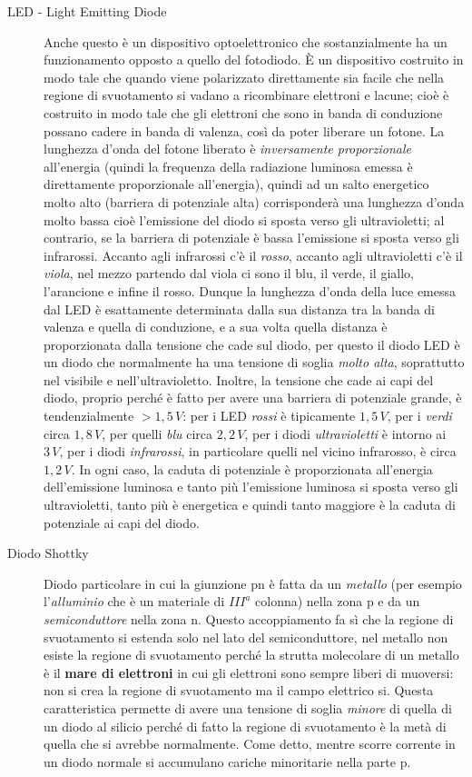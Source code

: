 \documentclass[12pt, a4paper]{report}
\begin{document}
\begin{description}
    \item[LED - Light Emitting Diode] Anche questo è un dispositivo optoelettronico che sostanzialmente ha un funzionamento opposto a quello del fotodiodo. È un dispositivo costruito in modo tale che quando viene polarizzato direttamente sia facile che nella regione di svuotamento si vadano a ricombinare elettroni e lacune; cioè è costruito in modo tale che gli elettroni che sono in banda di conduzione possano cadere in banda di valenza, così da poter liberare un fotone. La lunghezza d'onda del fotone liberato è \textit{inversamente proporzionale} all'energia (quindi la frequenza della radiazione luminosa emessa è direttamente proporzionale all'energia), quindi ad un salto energetico molto alto (barriera di potenziale alta) corrisponderà una lunghezza d'onda molto bassa cioè l'emissione del diodo si sposta verso gli ultravioletti; al contrario, se la barriera di potenziale è bassa l'emissione si sposta verso gli infrarossi. Accanto agli infrarossi c'è il \textit{rosso}, accanto agli ultravioletti c'è il \textit{viola}, nel mezzo partendo dal viola ci sono il blu, il verde, il giallo, l'arancione e infine il rosso. Dunque la lunghezza d'onda della luce emessa dal LED è esattamente determinata dalla sua distanza tra la banda di valenza e quella di conduzione, e a sua volta quella distanza è proporzionata dalla tensione che cade sul diodo, per questo il diodo LED è un diodo che normalmente ha una tensione di soglia \textit{molto alta}, soprattutto nel visibile e nell'ultravioletto. Inoltre, la tensione che cade ai capi del diodo, proprio perché è fatto per avere una barriera di potenziale grande, è tendenzialmente $> 1,5\,V$: per i LED \textit{rossi} è tipicamente $1,5\,V$, per i \textit{verdi} circa $1,8\,V$, per quelli \textit{blu} circa $2,2\,V$, per i diodi \textit{ultravioletti} è intorno ai $3\,V$, per i diodi \textit{infrarossi}, in particolare quelli nel vicino infrarosso, è circa $1,2\,V$. In ogni caso, la caduta di potenziale è proporzionata all'energia dell'emissione luminosa e tanto più l'emissione luminosa si sposta verso gli ultravioletti, tanto più è energetica e quindi tanto maggiore è la caduta di potenziale ai capi del diodo.
    \item[Diodo Shottky] Diodo particolare in cui la giunzione pn è fatta da un \textit{metallo} (per esempio l'\textit{alluminio} che è un materiale di $III^{a}$ colonna) nella zona p e da un \textit{semiconduttore} nella zona n. Questo accoppiamento fa sì che la regione di svuotamento si estenda solo nel lato del semiconduttore, nel metallo non esiste la regione di svuotamento perché la strutta molecolare di un metallo è il \textbf{mare di elettroni} in cui gli elettroni sono sempre liberi di muoversi: non si crea la regione di svuotamento ma il campo elettrico si. Questa caratteristica permette di avere una tensione di soglia \textit{minore} di quella di un diodo al silicio perché di fatto la regione di svuotamento è la metà di quella che si avrebbe normalmente. Come detto, mentre scorre corrente in un diodo normale si accumulano cariche minoritarie nella parte p.

\end{description}
\end{document}
